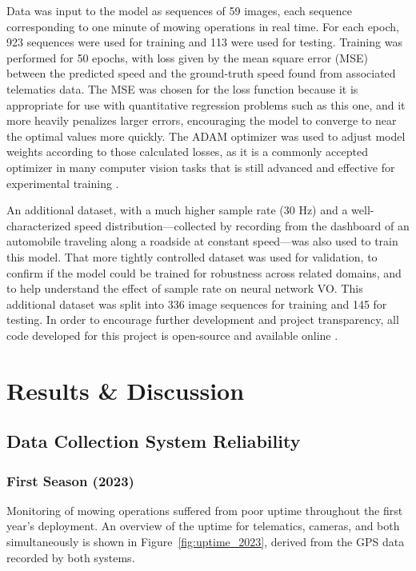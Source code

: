 \documentclass[
]{article}
\begin{document}
Data was input to the model as sequences of 59 images, each sequence
corresponding to one minute of mowing operations in real time. For each
epoch, 923 sequences were used for training and 113 were used for
testing. Training was performed for 50 epochs, with loss given by the
mean square error (MSE) between the predicted speed and the ground-truth
speed found from associated telematics data. The MSE was chosen for the
loss function because it is appropriate for use with quantitative
regression problems such as this one, and it more heavily penalizes
larger errors, encouraging the model to converge to near the optimal
values more quickly. The ADAM optimizer was used to adjust model weights
according to those calculated losses, as it is a commonly accepted
optimizer in many computer vision tasks that is still advanced and
effective for experimental training
\parencite{Reddi_ConvergenceAdam_2018}.

An additional dataset, with a much higher sample rate (30 Hz) and a
well-characterized speed distribution---collected by recording from the
dashboard of an automobile traveling along a roadside at constant
speed---was also used to train this model. That more tightly controlled
dataset was used for validation, to confirm if the model could be
trained for robustness across related domains, and to help understand
the effect of sample rate on neural network VO. This additional dataset
was split into 336 image sequences for training and 145 for testing. In
order to encourage further development and project transparency, all
code developed for this project is open-source and available online
\parencite{Wiegman_MsThesisRepo_2025}.

\clearpage

\chapter{Results \& Discussion}\label{results-discussion}

\section{Data Collection System Reliability}\label{sec:uptime}

\subsection{First Season (2023)}\label{sec:uptime_2023}

Monitoring of mowing operations suffered from poor uptime throughout the
first year's deployment. An overview of the uptime for telematics,
cameras, and both simultaneously is shown in
Figure~\ref{fig:uptime_2023}, derived from the GPS data recorded by both
systems.
\end{document}
